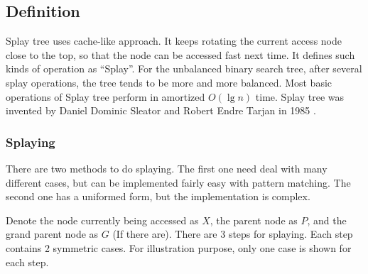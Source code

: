 \documentclass[b5paper]{article}
\begin{document}
\subsection{Definition}

Splay tree uses cache-like approach. It keeps rotating the current
access node close to the top, so that the node can be accessed fast
next time. It defines such kinds of operation as ``Splay''. For the
unbalanced binary search tree, after several splay operations, the
tree tends to be more and more balanced. Most basic operations of
Splay tree perform in amortized $O(\lg n)$ time. Splay tree was invented
by Daniel Dominic Sleator and Robert Endre Tarjan in 1985\cite{wiki-splay-tree}
\cite{self-adjusting-trees}.

\subsubsection{Splaying}

There are two methods to do splaying. The first one need deal
with many different cases, but can be implemented fairly easy with
pattern matching. The second one has a uniformed form, but the implementation
is complex.

Denote the node currently being accessed as $X$, the parent node as $P$,
and the grand parent node as $G$ (If there are).  There are 3 steps for
splaying. Each step contains 2 symmetric cases. For illustration
purpose, only one case is shown for each step.
\end{document}
